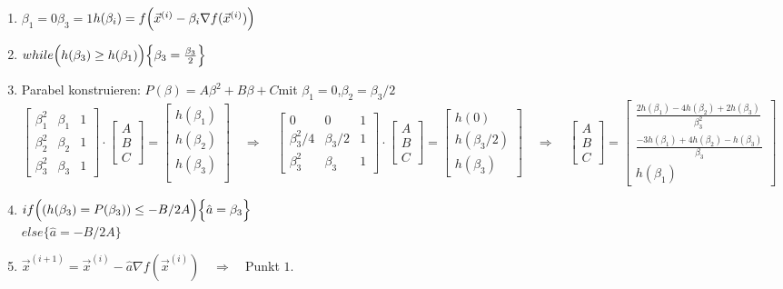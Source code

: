  \begin{enumerate}
	\item $\beta_1=0$\quad$\beta_3=1$\qquad$h(\beta_i)=f\Bigl(\vec{x}^{(i)} - \beta_i \nabla f(\vec{x}^{(i)})\Bigr)$
	\item $while\Bigl(h(\beta_3)\geq h(\beta_1)\Bigl)\Bigl\{\beta_3=\frac{\beta_3}{2}\Bigr\}$
	\item Parabel konstruieren: $P(\beta)=A\beta^2+B\beta+C$\quad mit \quad $\beta_1=0$,\quad $\beta_2=\beta_3/2$\\
		$\begin{bmatrix}
		\beta_1^2 & \beta_1 & 1\\
		\beta_2^2 & \beta_2 & 1\\
		\beta_3^2 & \beta_3 & 1
		\end{bmatrix}\cdot\begin{bmatrix}A\\B\\C\end{bmatrix}=\begin{bmatrix}h(\beta_1)\\ h(\beta_2)\\ h(\beta_3)\\\end{bmatrix}\quad\Rightarrow\quad\begin{bmatrix}
		0 & 0 & 1\\
		\beta_3^2/4 & \beta_3/2 & 1\\
		\beta_3^2 & \beta_3 & 1
		\end{bmatrix}\cdot\begin{bmatrix}A\\B\\C\end{bmatrix}=\begin{bmatrix}h(0)\\ h(\beta_3/2)\\ h(\beta_3)\end{bmatrix}\quad\Rightarrow\quad
		\begin{bmatrix}A\\B\\C\end{bmatrix}=\begin{bmatrix}
		\frac{2h(\beta_1)-4h(\beta_2)+2h(\beta_3)}{\beta_3^2}\\[0.2cm]
		\frac{-3h(\beta_1)+4h(\beta_2)-h(\beta_3)}{\beta_3}\\[0.1cm]
		h(\beta_1)\end{bmatrix}$
  	\item $if\Bigl( (h(\beta_3) = P(\beta_3))\leq-B/2A\Bigr)\Big\{\hat{a}=\beta_3\Big\}$\\
  	$else\Big\{\hat{a}=-B/2A\Big\}$
  	\item $\vec{x}^{(i+1)} = \vec{x}^{(i)} - \hat{a}\nabla f(\vec{x}^{(i)})\quad\Rightarrow\quad $Punkt $ 1.$
  	
  	
 \end{enumerate}
 

